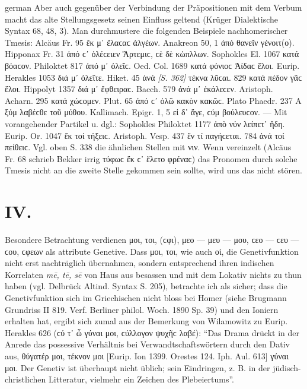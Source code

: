\begin{otherlanguage*}{german}
Aber auch gegenüber der Verbindung der Prä\-po\-si\-ti\-o\-nen mit dem Ver\-bum macht das alte Stellungsgesetz seinen Einfluss geltend (Krüger Dialektische Syntax 68, 48, 3). Man durchmustere die folgenden Beispiele nachhomerischer Tmesis: Alcäus Fr. 95 ἔκ μ᾽ ἔλαϲαϲ ἀλγέων. Anakreon 50, 1 ἀπό  θανεῖν γένοιτ(ο). Hipponax Fr. 31 ἀπό ϲ᾽ ὀλέϲειεν Ἄρτεμιϲ, ϲὲ δὲ κὠπλλων. Sophokles El. 1067 κατά  βόαϲον. Philoktet 817 ἀπό μ᾽ ὀλεῖϲ. Oed. Col. 1689 κατά  φόνιοϲ Ἀίδαϲ ἕλοι. Eurip. Herakles 1053 διά μ᾽ ὀλεῖτε. Hiket. 45 ἀνά \hypertarget{p362}{\emph{[S. 362]}}\label{p362}  τέκνα λῦϲαι. 829 κατά  πέδον γᾶϲ ἕλοι. Hippolyt 1357 διά μ᾽ ἔφθειραϲ. Bacch. 579 ἀνά μ᾽ ἐκάλεϲεν. Aristoph. Acharn. 295 κατά  χώϲομεν. Plut. 65 ἀπό ϲ᾽ ὀλῶ κακὸν κακῶϲ. Plato Phaedr. 237 Α ξύμ  λαβέϲθε τοῦ μύθου. Kallimach. Epigr. 1, 5 εἰ δ᾽ ἄγε, ϲύμ  βούλευϲον. — Mit vorangehender Partikel u. dgl.: Sophokles Philoktet 1177 ἀπὸ νύν  λείπετ᾽ ἤδη. Eurip. Or. 1047 ἔκ τοί  τήξειϲ. Aristoph. Vesp. 437 ἔν τί  παγήϲεται. 784 ἀνά τοί  πείθειϲ. Vgl. oben S. 338 die ähnlichen Stellen mit νιν. Wenn vereinzelt (Alcäus Fr. 68 schrieb Bekker irrig τύφωϲ ἔκ ϲ᾽ ἕλετο φρέναϲ) das Pronomen durch solche Tmesis nicht an die zweite Stelle gekommen sein sollte, wird uns das nicht stören.

\section*{IV.}

Besondere Betrachtung verdienen μοι, τοι, (ϲφι), μεο — μευ — μου, ϲεο — ϲευ — ϲου, ϲφεων als attribute Genetive. Dass μοι, τοι, wie auch οἱ, die Genetivfunktion nicht erst nachträglich übernahmen, sondern entsprechend ihren indischen Korrelaten \emph{mē, tē, sē} von Haus aus besassen und mit dem Lokativ nichts zu thun haben (vgl. Delbrück Altind. Syntax S. 205), betrachte ich als sicher; dass die Genetivfunktion sich im Griechischen nicht bloss bei Homer (siehe Brugmann Grundriss II 819. Verf. Berliner philol. Woch. 1890 Sp. 39) und den Ioniern erhalten hat, ergibt sich zumal aus der Bemerkung von Wilamowitz zu Eurip. Herakles 626 (ϲύ τ᾽ ὦ γύναι μοι, ϲύλλογον ψυχῆϲ λαβέ): “Das Drama drückt in der Anrede das possessive Verhältnis bei Verwandtschaftswörtern durch den Dativ aus, θύγατέρ μοι, τέκνον μοι [Eurip. Ion 1399. Orestes 124. Iph. Aul. 613] γύναι μοι. Der Genetiv ist überhaupt nicht üblich; sein Eindringen, z. B. in der jüdisch-christlichen Litteratur, vielmehr ein Zeichen des Plebeiertums”.


\end{otherlanguage*}

